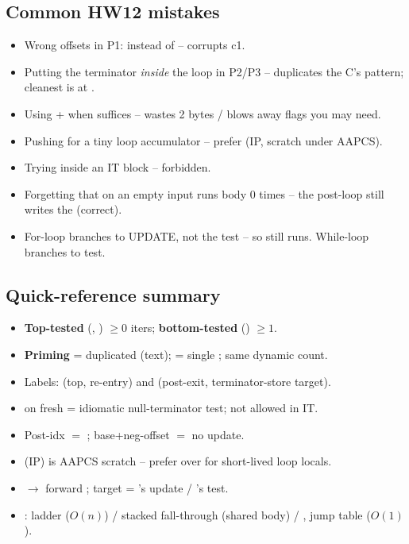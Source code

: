 \subsection{Common HW12 mistakes}
\begin{itemize}
\item Wrong offsets in P1:  instead of  -- corrupts c1.
\item Putting the terminator  \emph{inside} the loop in P2/P3 -- duplicates the C's  pattern; cleanest is at .
\item Using + when  suffices -- wastes 2 bytes / blows away flags you may need.
\item Pushing  for a tiny loop accumulator -- prefer  (IP, scratch under AAPCS).
\item Trying  inside an IT block -- forbidden.
\item Forgetting that  on an empty input runs body 0 times -- the post-loop  still writes the  (correct).
\item For-loop  branches to UPDATE, not the test -- so  still runs. While-loop  branches to test.
\end{itemize}

\subsection{Quick-reference summary}
\begin{itemize}
\item \textbf{Top-tested} (, ) $\ge 0$ iters; \textbf{bottom-tested} () $\ge 1$.
\item \textbf{Priming } = duplicated  (text); \textbf{} = single ; same dynamic count.
\item Labels:  (top, re-entry) and  (post-exit, terminator-store target).
\item {} on fresh  = idiomatic null-terminator test; not allowed in IT.
\item Post-idx  $=$ ; base+neg-offset \asm{[r0,\#-k]} $=$  no update.
\item {} (IP) is AAPCS scratch -- prefer over  for short-lived loop locals.
\item {} $\to$ forward ;  target = 's update / 's test.
\item {}: ladder ($O(n)$) / stacked fall-through (shared body) / , jump table ($O(1)$).
\end{itemize}
